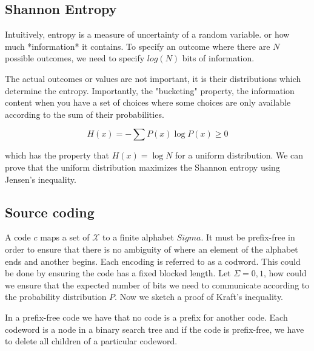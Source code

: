 \documentclass[twoside]{article}
\begin{document}
\subsection{Shannon Entropy}

Intuitively, entropy is a measure of uncertainty of a random variable. 
or how much *information* it contains. To specify an outcome where 
there are $N$ possible outcomes, we need to specify $log(N)$ bits of information. 

The actual outcomes or values are not important, it is their distributions which 
determine the entropy. Importantly, the "bucketing" property, the information 
content when you have a set of choices where some choices are only available 
according to the sum of their probabilities. 

\begin{equation}
H(x) = -\sum P(x)\log P(x) \geq 0
\end{equation}

which has the property that $H(x) = \log N$ for a uniform distribution. We can 
prove that the uniform distribution maximizes the Shannon entropy using Jensen's 
inequality. 

\subsection{Source coding}

A code $c$ maps a set of $\mathcal{X}$ to a finite alphabet $Sigma$. It must be 
prefix-free in order to ensure that there is no ambiguity of where an element 
of the alphabet ends and another begins. Each encoding is referred to as a 
codword. This could be done by ensuring the code has a fixed blocked length. 
Let $\Sigma = {0,1}$, how could we ensure that the expected number of bits 
we need to communicate according to the probability distribution $P$. Now 
we sketch a proof of Kraft's inequality. 

In a prefix-free code we have that no code is a prefix for another code. 
Each codeword is a node in a binary search tree and if the code is prefix-free, 
we have to delete all children of a particular codeword. 
\end{document}

